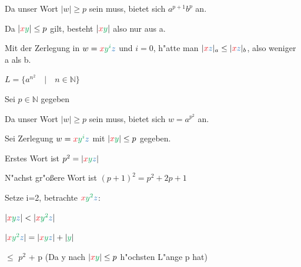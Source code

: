 \documentclass[11pt, a4paper]{scrartcl}
\newcommand{\gr}[1]{{\color{Green}#1}}
\newcommand{\bl}[1]{{\color{RoyalBlue}#1}}
\newcommand{\rd}[1]{{\color{Red}#1}}
\begin{document}
\vspace{0.5em}

Da unser Wort $|w| \geq p$ sein muss, bietet sich $a^{p+1} b^p$ an.

\vspace{0.5em}

Da $|\rd{x}\gr{y}| \leq p$ gilt, besteht $|\rd{x}\gr{y}|$ also nur aus a.

\vspace{0.5em}

Mit der Zerlegung in $w = \rd{x}\gr{y^i}\bl{z}$ und $i = 0$, h"atte man $|\rd{x}\bl{z}|_a \leq  |\rd{x}\bl{z}|_b$, also weniger a als b.


\vspace{5em}


$L = \{a^{n^2} \quad | \quad n \in \mathbb{N}\}$

\vspace{1.5em}

Sei $p \in \mathbb{N}$ gegeben

\vspace{0.5em}

Da unser Wort $|w| \geq p$ sein muss, bietet sich $w = a^{p^2}$ an.

\vspace{0.5em}

Sei Zerlegung $w = \rd{x}\gr{y^i}\bl{z}$ mit $|\rd{x}\gr{y}| \leq p$ gegeben.

\vspace{0.5em}

Erstes Wort ist $p^2 = |\rd{x}\gr{y}\bl{z}|$

\vspace{0.5em}

N"achst gr"oßere Wort ist $(p+1)^2 = p^2 + 2p + 1$

\vspace{0.5em}

Setze i=2, betrachte $\rd{x}\gr{y^2}\bl{z}$:

\vspace{0.5em}

$|\rd{x}\gr{y}\bl{z}| < |\rd{x}\gr{y^2}\bl{z}|$

\vspace{0.5em}

$|\rd{x}\gr{y^2}\bl{z}| = |\rd{x}\gr{y}\bl{z}| + |\gr{y}|$

\qquad \quad $\leq$ $p^2$ \quad + p (Da y nach $|\rd{x}\gr{y}| \leq p$ h"ochsten L"ange p hat)

\vspace{0.5em}
\end{document}
